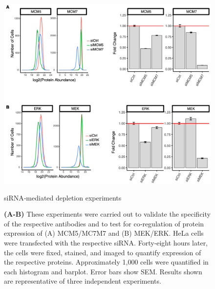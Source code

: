 \begin{figure}[hbt!]
\centering
\includegraphics[width=14cm, keepaspectratio]{figs/paper1/figS6.png}
\caption{siRNA‐mediated depletion experiments}
\caption*{\textbf{(A-B)} These experiments were carried out to validate the specificity of the respective antibodies and to test for co‐regulation of protein expression of (A) MCM5/MC7M7 and (B) MEK/ERK. HeLa cells were transfected with the respective siRNA. Forty‐eight hours later, the cells were fixed, stained, and imaged to quantify expression of the respective proteins. Approximately 1,000 cells were quantified in each histogram and barplot. Error bars show SEM. Results shown are representative of three independent experiments.
}
\label{fig:paper1_figS6}
\end{figure}



